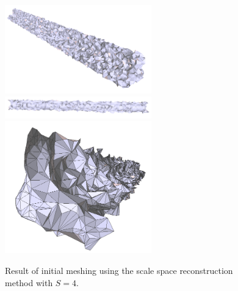 \documentclass[12pt]{drexelthesis}
\begin{document}
\begin{figure}[!ht]
	
	\centering
		\includegraphics[width=2.5in]{simulated-lab-scan/2cmnoise/2cmmesh/scalespace400.png}
		\includegraphics[width=2.5in]{simulated-lab-scan/2cmnoise/2cmmesh/scalespace401.png}
		\includegraphics[width=2.5in]{simulated-lab-scan/2cmnoise/2cmmesh/scalespace402.png}
		\caption[Initial meshing using a scale space reconstruction with $S = 4$]{\centering  Result of initial meshing using the scale space reconstruction method with $S = 4$.}
		\label{2cmnoise:scalespace4}
\end{figure}
\end{document}
